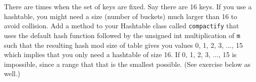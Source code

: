   There are times when the set of keys are fixed.
  Say there are 16 keys.
  If you use a hashtable, you might need a size (number of buckets)
  much larger than 16 to avoid collision.
  Add a method to your Hashtable class called \verb!compactify!
  that uses the default hash function followed by the unsigned int
  multiplication of \verb!m! such that
  the resulting hash mod size of table gives you
  values 0, 1, 2, 3, ..., 15 which implies that
  you only need a hashtable of size 16.
  If 0, 1, 2, 3, ..., 15 is impossible, since a range that that is the
  smallest possible.
  (See exercise below as well.)
